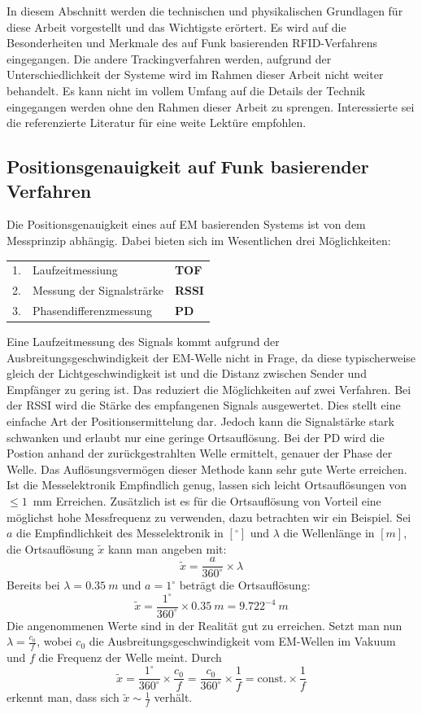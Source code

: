 In diesem Abschnitt werden die technischen und physikalischen Grundlagen für diese Arbeit vorgestellt und das Wichtigste erörtert. Es wird auf die Besonderheiten und Merkmale des auf Funk basierenden RFID-Verfahrens eingegangen. Die andere Trackingverfahren werden, aufgrund der Unterschiedlichkeit der Systeme wird im Rahmen dieser Arbeit nicht weiter behandelt. Es kann nicht im vollem Umfang auf die Details der Technik eingegangen werden ohne den Rahmen dieser Arbeit zu sprengen. Interessierte sei die referenzierte Literatur für eine weite Lektüre empfohlen.
%
%
\subsection{Positionsgenauigkeit auf Funk basierender Verfahren}
\label{sec:RFID_Accuracy}
Die Positionsgenauigkeit eines auf EM basierenden Systems ist von dem Messprinzip abhängig. Dabei bieten sich im Wesentlichen drei Möglichkeiten:
%
\begin{table} [ht!]
	\begin{center}
		\begin{tabular}{lp{65mm}p{15mm}}
		1. & Laufzeitmessiung & \textbf{TOF} \\
		2. & Messung der Signalsträrke & \textbf{RSSI} \\
		3. & Phasendifferenzmessung & \textbf{PD} \\
		\end{tabular}
	\end{center}
\end{table}
%

Eine Laufzeitmessung des Signals kommt aufgrund der Ausbreitungsgeschwindigkeit der EM-Welle nicht in Frage, da diese typischerweise gleich der Lichtgeschwindigkeit ist und die Distanz zwischen Sender und Empfänger zu gering ist. Das reduziert die Möglichkeiten auf zwei Verfahren.
Bei der RSSI wird die Stärke des empfangenen Signals ausgewertet. Dies stellt eine einfache Art der Positionsermittelung dar. Jedoch kann die Signalstärke stark schwanken und erlaubt nur eine geringe Ortsauflösung. Bei der PD wird die Postion anhand der zurückgestrahlten Welle ermittelt, genauer der Phase der Welle. Das Auflösungsvermögen dieser Methode kann sehr gute Werte erreichen. Ist die Messelektronik Empfindlich genug, lassen sich leicht Ortsauflösungen von $\le 1$~mm Erreichen. Zusätzlich ist es für die Ortsauflösung von Vorteil eine möglichst hohe Messfrequenz zu verwenden, dazu betrachten wir ein Beispiel. Sei $a $ die Empfindlichkeit des Messelektronik in $[^\circ]$ und $\lambda$ die Wellenlänge in $[m]$, die Ortsauflösung $\tilde{x}$ kann man angeben mit:
$$
\tilde{x}=\frac{a}{360^{\circ}}\times\lambda
$$
Bereits bei $\lambda =0.35~m$ und $a=1^\circ$ beträgt die Ortsauflösung:
$$
\tilde{x}=\frac{1^{\circ}}{360^{\circ}}\times 0.35~m=9.722^{-4}~m
$$
%
Die angenommenen Werte sind in der Realität gut zu erreichen. Setzt man nun $\lambda=\frac{c_0}{f}$, wobei $c_0$ die Ausbreitungsgeschwindigkeit vom EM-Wellen im Vakuum und $f$ die Frequenz der Welle meint.  Durch
$$
\tilde{x}=\frac{1^{\circ}}{360^{\circ}}\times\frac{c_0}{f} =\frac{c_0}{360^{\circ}}\times\frac{1}{f} = \text{const.}\times\frac{1}{f}
$$
erkennt man, dass sich $\tilde{x}\sim\frac{1}{f}$ verhält.
%
